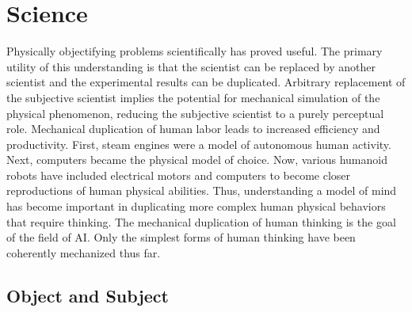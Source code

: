 \chapter{Science}
\label{chapter:science}

Physically objectifying problems scientifically has proved useful.
The primary utility of this understanding is that the scientist can be
replaced by another scientist and the experimental results can be
duplicated.  Arbitrary replacement of the subjective scientist implies
the potential for mechanical simulation of the physical phenomenon,
reducing the subjective scientist to a purely perceptual role.
Mechanical duplication of human labor leads to increased efficiency
and productivity.  First, steam engines were a model of autonomous
human activity.  Next, computers became the physical model of choice.
Now, various humanoid robots have included electrical motors and
computers to become closer reproductions of human physical abilities.
Thus, understanding a model of mind has become important in
duplicating more complex human physical behaviors that require
thinking.  The mechanical duplication of human thinking is the goal of
the field of AI.  Only the simplest forms of human thinking have been
coherently mechanized thus far.

\section{Object and Subject}

